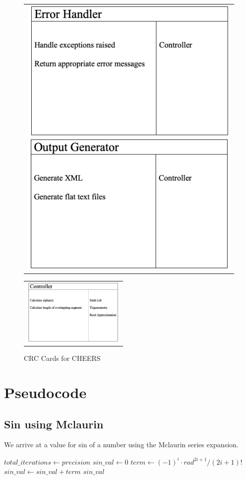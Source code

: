 \documentclass{report}
\begin{document}
\begin{figure}[h!]
      \begin{tabular}{@{}c@{}}
        \includegraphics[width=.4\linewidth]{resources/ErrorHandler.png} 
          \hspace*{30pt}
        \includegraphics[width=.4\linewidth]{resources/OutputGenerator.png}
      \end{tabular}
      
      \begin{tabular}{@{}c@{}}
        \includegraphics[width=.5\linewidth,height=90pt]{resources/Controller.png}
      \end{tabular}

      \vspace{\floatsep}
    \caption{CRC Cards for CHEERS}\label{fig:myfig}
\end{figure}

\chapter*{Pseudocode}
\section{Sin using Mclaurin}
We arrive at a value for sin of a number using the Mclaurin series expansion.
\break
\begin{algorithmic}[1]
        \State $total\_iterations \gets precision$
        \State $sin\_val \gets 0$
            \State $term \gets (-1)^i \cdot rad^{2i + 1} / (2i + 1)!$
            \State $sin\_val \gets sin\_val + term$
        \EndFor
        \State \Return $sin\_val$
    \EndFunction
\end{algorithmic}
\end{document}

